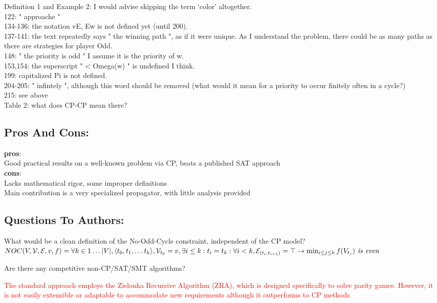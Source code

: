 \documentclass{article}
\begin{document}
Definition 1 and Example 2: I would advise skipping the term ‘color’ altogether.\\
122: " approache "\\
134-136: the notation vE, Ew is not defined yet (until 200).\\
137-141: the text repeatedly says " the winning path ", as if it were unique. As I understand the problem, there could be as many paths as there are strategies for player Odd.\\
148: " the priority is odd " I assume it is the priority of w.\\
153,154: the superscript " < Omega(w) " is undefined I think.\\
199: capitalized Pi is not defined.\\
204-205: " infintely ", although this word should be removed (what would it mean for a priority to occur finitely often in a cycle?)\\
215: see above\\
Table 2: what does CP-CP mean there?\\

\subsection*{Pros And Cons:}
\textbf{pros}:\\
Good practical results on a well-known problem via CP, beats a published SAT approach\\
\textbf{cons}:\\
Lacks mathematical rigor, some improper definitions\\
Main contribution is a very specialized propagator, with little analysis provided
\subsection*{Questions To Authors:}
What would be a clean definition of the No-Odd-Cycle constraint, independent of the CP model?
\\
\textcolor{red}{
$
NOC(V,\mathcal{V},\mathcal{E},v,f) =\\ \forall k\in 1\dots|V|, 
\langle t_0,t_1, \dots t_k \rangle, 
\mathcal{V}_{t_0} = v,  \exists i \leq k : t_i = t_k :\\
\forall i<k, \mathcal{E}_{(t_i,t_{i+1})} = \top 
\rightarrow \min_{i\leq j\leq k} f(V_{t_j})\textit{ is even}
$
}

Are there any competitive non-CP/SAT/SMT algorithms?

\textcolor{red}{The standard approach employs the Zielonka Recursive Algorithm (ZRA), which is designed specifically to solve parity games. However, it is not easily extensible or adaptable to accommodate new requirements although it outperforms to CP methods}
\end{document}
